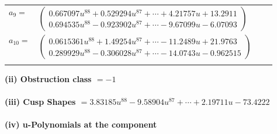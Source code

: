\documentclass[1p]{elsarticle_modified}
\theoremstyle{definition}
\begin{document}
\begin{tabular}{m{7pt} m{180pt} m{7pt} m{180pt} }
\flushright $a_{9}=$&$\begin{pmatrix}0.667097 u^{88}+0.529294 u^{87}+\cdots+4.21757 u+13.2911\\0.694535 u^{88}-0.923902 u^{87}+\cdots-9.67099 u-6.07093\end{pmatrix}$ \\
\flushright $a_{10}=$&$\begin{pmatrix}0.0615361 u^{88}+1.49254 u^{87}+\cdots-11.2489 u+21.9763\\0.289929 u^{88}-0.306028 u^{87}+\cdots-14.0743 u-0.962515\end{pmatrix}$\\&\end{tabular}
\flushleft \textbf{(ii) Obstruction class $= -1$}\\~\\
\flushleft \textbf{(iii) Cusp Shapes $= 3.83185 u^{88}-9.58904 u^{87}+\cdots+2.19711 u-73.4222$}\\~\\
\newpage\renewcommand{\arraystretch}{1}
\flushleft \textbf{(iv) u-Polynomials at the component}\newline \\
\end{document}
